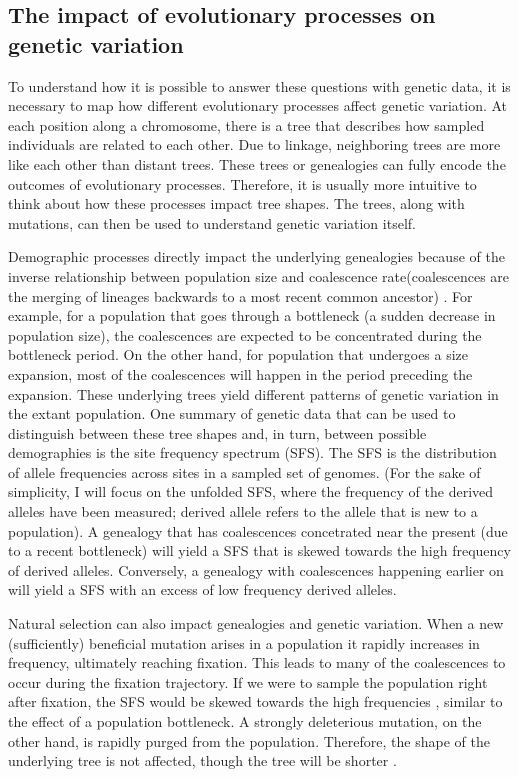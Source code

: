 \subsection{The impact of evolutionary processes on genetic variation}

To understand how it is possible to answer these questions with genetic data,
it is necessary to map how different evolutionary processes affect genetic variation.
At each position along a chromosome, there is a tree that describes how sampled individuals are related to each other.
Due to linkage, neighboring trees are more like each other than distant trees.
These trees or genealogies can fully encode the outcomes of evolutionary processes.
Therefore, it is usually more intuitive to think about how these processes impact tree shapes.
The trees, along with mutations, can then be used to understand genetic variation itself.

Demographic processes directly impact the underlying genealogies because of the inverse relationship between population size and coalescence rate(coalescences are the merging of lineages backwards to a most recent common ancestor) \citep{wakely_coalescent_2016}.
For example, for a population that goes through a bottleneck (\ie a sudden decrease in population size),
the coalescences are expected to be concentrated during the bottleneck period.
On the other hand, for population that undergoes a size expansion,
most of the coalescences will happen in the period preceding the expansion.
These underlying trees yield different patterns of genetic variation in the extant population.
One summary of genetic data that can be used to distinguish between these tree shapes and,
in turn, between possible demographies is the site frequency spectrum (SFS).
The SFS is the distribution of allele frequencies across sites in a sampled set of genomes.
(For the sake of simplicity, I will focus on the unfolded SFS, where the frequency of the derived alleles have been measured; derived allele refers to the allele that is new to a population).
A genealogy that has coalescences concetrated near the present (due to a recent bottleneck) will yield a SFS that is skewed towards the high frequency of derived alleles.
Conversely, a genealogy with coalescences happening earlier on will yield a SFS with an excess of low frequency derived alleles.

Natural selection can also impact genealogies and genetic variation.
When a new (sufficiently) beneficial mutation arises in a population it rapidly increases in frequency, ultimately reaching fixation.
This leads to many of the coalescences to occur during the fixation trajectory.
If we were to sample the population right after fixation,
the SFS would be skewed towards the high frequencies \citep{kim_allele_2006}, similar to the effect of a population bottleneck.
A strongly deleterious mutation, on the other hand, is rapidly purged from the population.
Therefore, the shape of the underlying tree is not affected, though the tree will be shorter \citep{williamson_genealogy_2002, barton_effect_2004}.


